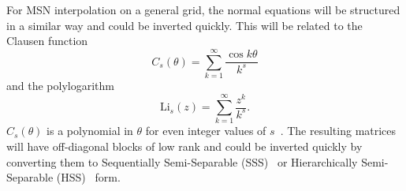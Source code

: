 For MSN interpolation on a general grid, the normal equations will
be structured in a similar way and could be inverted quickly.
This will be related to the Clausen function
%
\begin{equation}
    C_{s}(\theta) = \sum_{k=1}^{\infty}\frac{\cos k\theta}{k^{s}}
\end{equation}
%
and the polylogarithm
%
\begin{equation}
    \textrm{Li}_{s}(z) = \sum_{k=1}^{\infty} \frac{z^{k}}{k^{s}}.
\end{equation}
%
$C_{s}(\theta)$ is a polynomial in $\theta$ for even integer values of
$s$~\cite[Page 1005 (27.8.6)]{abramowitz1965handbook}.
The resulting matrices will have off-diagonal blocks of low rank and
could be inverted quickly by converting them
to Sequentially Semi-Separable (SSS)~\cite{chandrasekaran2005some}
or Hierarchically Semi-Separable (HSS)~\cite{Chandrasekaran2005HSS}
form.





